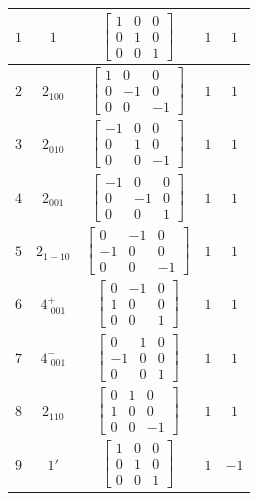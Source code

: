 \documentclass[fleqn,8pt]{jsarticle}
\begin{document}
\begin{longtable}{ccccc}
$ 1 $ & $ 1 $ & $ \begin{bmatrix} 1 & 0 & 0 \\ 0 & 1 & 0 \\ 0 & 0 & 1 \end{bmatrix} $ & $ 1 $ & $ 1 $ \\ \hline
$ 2 $ & $ 2{}_{100} $ & $ \begin{bmatrix} 1 & 0 & 0 \\ 0 & -1 & 0 \\ 0 & 0 & -1 \end{bmatrix} $ & $ 1 $ & $ 1 $ \\ \hline
$ 3 $ & $ 2{}_{010} $ & $ \begin{bmatrix} -1 & 0 & 0 \\ 0 & 1 & 0 \\ 0 & 0 & -1 \end{bmatrix} $ & $ 1 $ & $ 1 $ \\ \hline
$ 4 $ & $ 2{}_{001} $ & $ \begin{bmatrix} -1 & 0 & 0 \\ 0 & -1 & 0 \\ 0 & 0 & 1 \end{bmatrix} $ & $ 1 $ & $ 1 $ \\ \hline
$ 5 $ & $ 2{}_{1-10} $ & $ \begin{bmatrix} 0 & -1 & 0 \\ -1 & 0 & 0 \\ 0 & 0 & -1 \end{bmatrix} $ & $ 1 $ & $ 1 $ \\ \hline
$ 6 $ & $ 4^{+}_{\,\,001} $ & $ \begin{bmatrix} 0 & -1 & 0 \\ 1 & 0 & 0 \\ 0 & 0 & 1 \end{bmatrix} $ & $ 1 $ & $ 1 $ \\ \hline
$ 7 $ & $ 4^{-}_{\,\,001} $ & $ \begin{bmatrix} 0 & 1 & 0 \\ -1 & 0 & 0 \\ 0 & 0 & 1 \end{bmatrix} $ & $ 1 $ & $ 1 $ \\ \hline
$ 8 $ & $ 2{}_{110} $ & $ \begin{bmatrix} 0 & 1 & 0 \\ 1 & 0 & 0 \\ 0 & 0 & -1 \end{bmatrix} $ & $ 1 $ & $ 1 $ \\ \hline
$ 9 $ & $ 1{}' $ & $ \begin{bmatrix} 1 & 0 & 0 \\ 0 & 1 & 0 \\ 0 & 0 & 1 \end{bmatrix} $ & $ 1 $ & $ -1 $ \\ \hline

\end{longtable}
\end{document}
